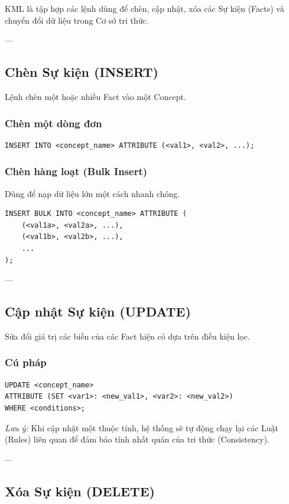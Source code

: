 KML là tập hợp các lệnh dùng để chèn, cập nhật, xóa các Sự kiện (Facts) và chuyển đổi dữ liệu trong Cơ sở tri thức.

---

\subsection{Chèn Sự kiện (INSERT)}

Lệnh chèn một hoặc nhiều Fact vào một Concept.

\subsubsection{Chèn một dòng đơn}
\begin{verbatim}
INSERT INTO <concept_name> ATTRIBUTE (<val1>, <val2>, ...);
\end{verbatim}

\subsubsection{Chèn hàng loạt (Bulk Insert)}
Dùng để nạp dữ liệu lớn một cách nhanh chóng.
\begin{verbatim}
INSERT BULK INTO <concept_name> ATTRIBUTE (
    (<val1a>, <val2a>, ...),
    (<val1b>, <val2b>, ...),
    ...
);
\end{verbatim}

---

\subsection{Cập nhật Sự kiện (UPDATE)}

Sửa đổi giá trị các biến của các Fact hiện có dựa trên điều kiện lọc.

\subsubsection{Cú pháp}
\begin{verbatim}
UPDATE <concept_name> 
ATTRIBUTE (SET <var1>: <new_val1>, <var2>: <new_val2>) 
WHERE <conditions>;
\end{verbatim}
\textit{Lưu ý:} Khi cập nhật một thuộc tính, hệ thống sẽ tự động chạy lại các Luật (Rules) liên quan để đảm bảo tính nhất quán của tri thức (Consistency).

---

\subsection{Xóa Sự kiện (DELETE)}

